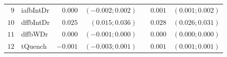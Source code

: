 \begin{table*}[!ht]
\begin{tabular*}{\textwidth}{@{}rlrrrrr@{}}
\footnotesize{$9 $} & \footnotesize{iafbIntDr} & \footnotesize{$0.000$}   & \footnotesize{$(-0.002;0.002)$} && \footnotesize{$0.001$} & \footnotesize{$(0.001;0.002)$} \\
\footnotesize{$10$} & \footnotesize{dffbIntDr} & \footnotesize{$0.025$}   & \footnotesize{$(0.015;0.036)$}  && \footnotesize{$0.028$} & \footnotesize{$(0.026;0.031)$} \\
\footnotesize{$11$} & \footnotesize{dffbWDr  } & \footnotesize{$0.000$}   & \footnotesize{$(-0.001;0.000)$} && \footnotesize{$0.000$} & \footnotesize{$(0.000;0.000)$} \\
\footnotesize{$12$} & \footnotesize{tQuench  } & \footnotesize{$-0.001$}  & \footnotesize{$(-0.003;0.001)$} && \footnotesize{$0.001$} & \footnotesize{$(0.001;0.001)$} \\

\bottomrule
\end{tabular*}
\end{table*}
